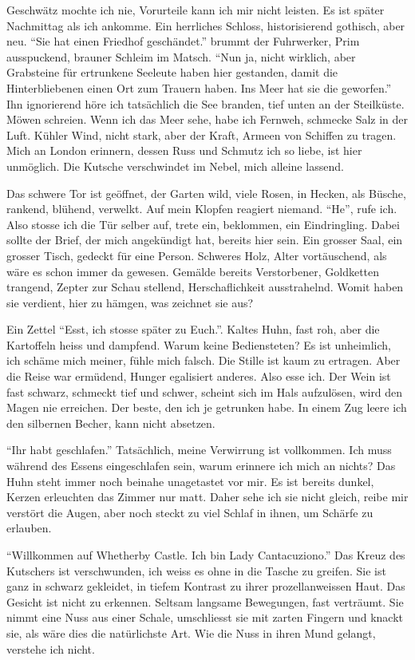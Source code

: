 Geschwätz mochte ich nie, Vorurteile kann ich mir nicht leisten. Es ist später Nachmittag als ich ankomme. Ein herrliches Schloss, historisierend gothisch, aber neu. \enquote{Sie hat einen Friedhof geschändet.} brummt der Fuhrwerker, Prim ausspuckend, brauner Schleim im Matsch. \enquote{Nun ja, nicht wirklich, aber Grabsteine für ertrunkene Seeleute haben hier gestanden, damit die Hinterbliebenen einen Ort zum Trauern haben. Ins Meer hat sie die geworfen.} Ihn ignorierend höre ich tatsächlich die See branden, tief unten an der Steilküste. Möwen schreien. Wenn ich das Meer sehe, habe ich Fernweh, schmecke Salz in der Luft. Kühler Wind, nicht stark, aber der Kraft, Armeen von Schiffen zu tragen. Mich an London erinnern, dessen Russ und Schmutz ich so liebe, ist hier unmöglich. Die Kutsche verschwindet im Nebel, mich alleine lassend.

Das schwere Tor ist geöffnet, der Garten wild, viele Rosen, in Hecken, als Büsche, rankend, blühend, verwelkt. Auf mein Klopfen reagiert niemand. \enquote{He}, rufe ich. Also stosse ich die Tür selber auf, trete ein, beklommen, ein Eindringling. Dabei sollte der Brief, der mich angekündigt hat, bereits hier sein. Ein grosser Saal, ein grosser Tisch, gedeckt für eine Person. Schweres Holz, Alter vortäuschend, als wäre es schon immer da gewesen. Gemälde bereits Verstorbener, Goldketten trangend, Zepter zur Schau stellend, Herschaflichkeit ausstrahelnd. Womit haben sie verdient, hier zu hämgen, was zeichnet sie aus?


Ein Zettel \enquote{Esst, ich stosse später zu Euch.}. Kaltes Huhn, fast roh, aber die Kartoffeln heiss und dampfend. Warum keine Bediensteten? Es ist unheimlich, ich schäme mich meiner, fühle mich falsch. Die Stille ist kaum zu ertragen. Aber die Reise war ermüdend, Hunger egalisiert anderes. Also esse ich. Der Wein ist fast schwarz, schmeckt tief und schwer, scheint sich im Hals aufzulösen, wird den Magen nie erreichen. Der beste, den ich je getrunken habe. In einem Zug leere ich den silbernen Becher, kann nicht absetzen.

\enquote{Ihr habt geschlafen.} Tatsächlich, meine Verwirrung ist vollkommen. Ich muss während des Essens eingeschlafen sein, warum erinnere ich mich an nichts? Das Huhn steht immer noch beinahe unagetastet vor mir. Es ist bereits dunkel, Kerzen erleuchten das Zimmer nur matt. Daher sehe ich sie nicht gleich, reibe mir verstört die Augen, aber noch steckt zu viel Schlaf in ihnen, um Schärfe zu erlauben.

\enquote{Willkommen auf Whetherby Castle. Ich bin Lady Cantacuziono.} Das Kreuz des Kutschers ist verschwunden, ich weiss es ohne in die Tasche zu greifen. Sie ist ganz in schwarz gekleidet, in tiefem Kontrast zu ihrer prozellanweissen Haut. Das Gesicht ist nicht zu erkennen. Seltsam langsame Bewegungen, fast verträumt. Sie nimmt eine Nuss aus einer Schale, umschliesst sie mit zarten Fingern und knackt sie, als wäre dies die natürlichste Art. Wie die Nuss in ihren Mund gelangt, verstehe ich nicht.

